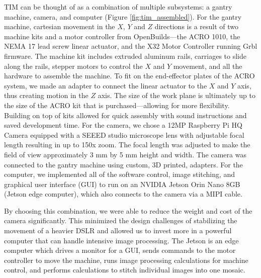 \documentclass[a4paper,12pt]{article}
\begin{document}
TIM can be thought of as a combination of multiple subsystems: a gantry machine, camera, and computer (Figure \ref{fig:tim_assembled}). 
For the gantry machine, cartesian movement in the $X$, $Y$ and $Z$ directions is a result of two machine kits and a motor controller from OpenBuilds---the ACRO 1010, the NEMA 17 lead screw linear actuator, and the X32 Motor Controller running Grbl firmware. %
The machine kit includes extruded aluminum rails, carriages to slide along the rails, stepper motors to control the $X$ and $Y$ movement, and all the hardware to assemble the machine. 
To fit on the end-effector plates of the ACRO system, we made an adapter to connect the linear actuator to the $X$ and $Y$ axis, thus creating motion in the $Z$ axis.
The size of the work plane is ultimately up to the size of the ACRO kit that is purchased---allowing for more flexibility.
Building on top of kits allowed for quick assembly with sound instructions and saved development time. 
For the camera, we chose a 12MP Raspberry Pi HQ Camera equipped with a SEEED studio microscope lens with adjustable focal length resulting in up to 150x zoom. The focal length was adjusted to make the field of view approximately 3 mm by 5 mm height and width. The camera was connected to the gantry machine using custom, 3D printed, adapters.
For the computer, we implemented all of the software control, image stitching, and graphical user interface (GUI) to run on an NVIDIA Jetson Orin Nano 8GB (Jetson edge computer), which also connects to the camera via a MIPI cable. %

By choosing this combination, we were able to reduce the weight and cost of the camera significantly. This minimized the design challenges of stabilizing the movement of a heavier DSLR and allowed us to invest more in a powerful computer that can handle intensive image processing. 
The Jetson is an edge computer which drives a monitor for a GUI, sends commands to the motor controller to move the machine, runs image processing calculations for machine control, and performs calculations to stitch individual images into one mosaic. 
\end{document}

